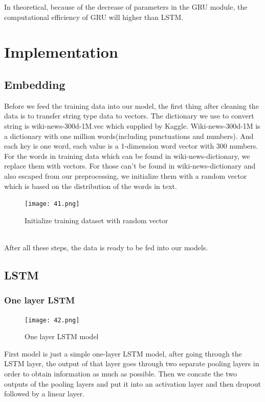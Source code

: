 \documentclass{article}
\begin{document}
\noindent In theoretical, because of the decrease of parameters in the GRU module, the computational efficiency of GRU will higher than LSTM. \\

\section{ Implementation}
\subsection{Embedding}
\noindent Before we feed the training data into our model, the first thing after cleaning the data is to transfer string type data to vectors. The dictionary we use to convert string is wiki-news-300d-1M.vec which supplied by Kaggle. Wiki-news-300d-1M is a dictionary with one million words(including punctuations and numbers). And each key is one word, each value is a 1-dimension  word vector with 300 numbers.\\

\noindent For the words in training data which can  be found in wiki-news-dictionary, we replace them with vectors. For those can’t be found in wiki-news-dictionary and also escaped from our preprocessing, we initialize them with a random vector which is based on the distribution of the words in text.\\
\begin{figure}[h]
	\centering
	\texttt{[image: 41.png]}
	\caption{Initialize training dataset with random vector}
\end{figure}\\
\noindent After all these steps, the data is ready to be fed into our models.\\

\subsection{LSTM}
\subsubsection{One layer LSTM}
\begin{figure}[h]
	\centering
	\texttt{[image: 42.png]}
	\caption{One layer LSTM model}
\end{figure}
\noindent First model is just a simple one-layer LSTM model, after going through the LSTM layer, the output of that layer goes through two separate pooling layers in order to obtain information as much as possible. Then we concate the two outputs of the pooling layers and put it into an activation layer and then dropout followed by a linear layer.\\
\end{document}
